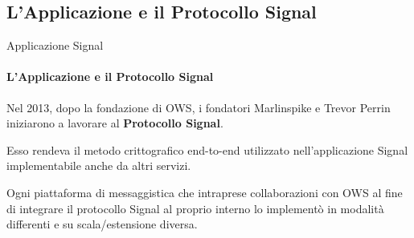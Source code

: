 \subsection{L'Applicazione e il Protocollo Signal}

\begin{frame}{Applicazione Signal}
    \framesubtitle{L'Applicazione e il Protocollo Signal}
    
    Nel 2013, dopo la fondazione di OWS, i fondatori Marlinspike e Trevor Perrin iniziarono a lavorare al \textbf{Protocollo Signal}.\newline\pause
    
    Esso rendeva il metodo crittografico end-to-end utilizzato nell’applicazione Signal implementabile anche da altri servizi.\newline\pause
    
    Ogni piattaforma di messaggistica che intraprese collaborazioni con OWS al fine di integrare il protocollo Signal al proprio interno lo implementò in modalità differenti e su scala/estensione diversa.

\end{frame}

